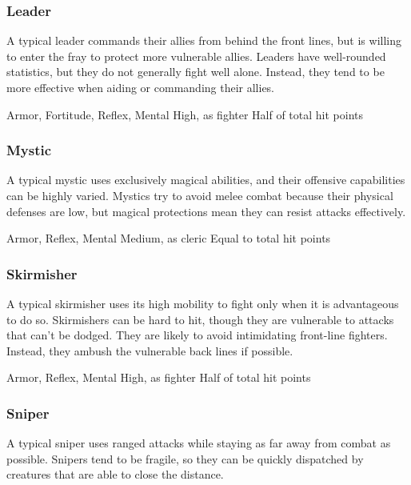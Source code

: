     \subsubsection{Leader}
      A typical leader commands their allies from behind the front lines, but is willing to enter the fray to protect more vulnerable allies.
      Leaders have well-rounded statistics, but they do not generally fight well alone.
      Instead, they tend to be more effective when aiding or commanding their allies.

        Armor,  Fortitude,  Reflex,  Mental
       High, as fighter
       Half of total hit points

    \subsubsection{Mystic}
      A typical mystic uses exclusively magical abilities, and their offensive capabilities can be highly varied.
      Mystics try to avoid melee combat because their physical defenses are low, but magical protections mean they can resist attacks effectively.

        Armor,  Reflex,  Mental
       Medium, as cleric
       Equal to total hit points

    \subsubsection{Skirmisher}
      A typical skirmisher uses its high mobility to fight only when it is advantageous to do so.
      Skirmishers can be hard to hit, though they are vulnerable to attacks that can't be dodged.
      They are likely to avoid intimidating front-line fighters.
      Instead, they ambush the vulnerable back lines if possible.

        Armor,  Reflex,  Mental
       High, as fighter
       Half of total hit points

    \subsubsection{Sniper}
      A typical sniper uses ranged attacks while staying as far away from combat as possible.
      Snipers tend to be fragile, so they can be quickly dispatched by creatures that are able to close the distance.

